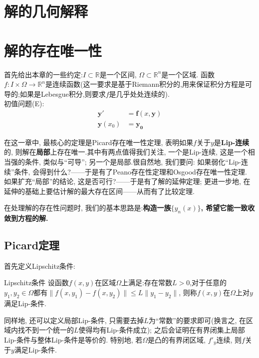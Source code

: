 \chapter{解的几何解释}

\chapter{解的存在唯一性}
首先给出本章的一些约定:$I\subset \mathbb{R}$是一个区间, $\Omega\subset \mathbb{R}^n$是一个区域.
函数$f:I\times\Omega\to\mathbb{R}^n$是连续函数(这一要求是基于Riemann积分的,用来保证积分方程是可导的;如果是Lebesgue积分,则要求$f$是几乎处处连续的).\\
初值问题(E):
\begin{equation}
    \begin{aligned}
        \mathbf{y'} &=  \mathbf{f}(x,\mathbf{y}) \\
        \mathbf{y}(x_0) &=  \mathbf{y_0}
    \end{aligned}
\end{equation}

在这一章中, 最核心的定理是Picard存在唯一性定理, 表明如果$f$关于$y$是\textbf{Lip-连续}的, 则解在\textbf{局部}上存在唯一.其中有两点值得我们关注, 
一个是Lip-连续, 这是一个相当强的条件, 类似与“可导”; 另一个是局部.很自然地, 我们要问: 如果弱化“Lip-连续”条件, 会得到什么?——于是有了Peano存在性定理和Osgood存在唯一性定理.
如果扩充“局部”的结论, 这是否可行?——于是有了解的延伸定理; 更进一步地, 在延伸的基础上要估计解的最大存在区间——从而有了比较定理.

在处理解的存在性问题时, 我们的基本思路是:\textbf{构造一族}$\{y_n(x)\}$\textbf{, 希望它能一致收敛到方程的解.}
\section{Picard定理}
首先定义Lipschitz条件:
\begin{definition}{Lipschitz条件}
    设函数$f(x,y)$在区域$\Omega$上满足:存在常数$L>0$,对于任意的$y_1,y_2\in\Omega$都有$\|f(x,y_1)-f(x,y_2)\|\leq L\|y_1-y_2\|$,
    则称$f(x,y)$在$\Omega$上对$y$满足Lip-条件.
\end{definition}
同样地, 还可以定义局部Lip-条件, 只需要去掉$L$为“常数”的要求即可(换言之, 在区域内找不到一个统一的$L$使得均有Lip-条件成立); 之后会证明在有界闭集上局部Lip-条件与整体Lip-条件是等价的.
特别地, 若$\Omega $是凸的有界闭区域, $f'_y$连续, 则$f$关于$y$满足Lip-条件.

